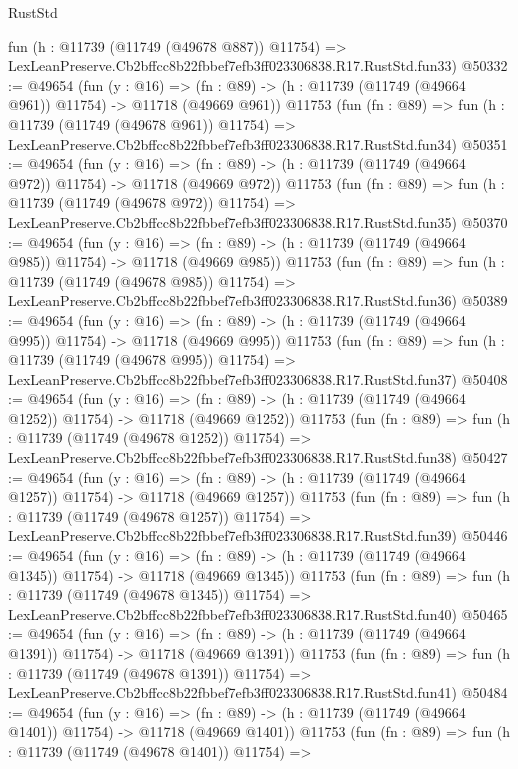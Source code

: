 \begin{lexlean}{RustStd}
\begin{coremodule}
    fun (h : @11739 (@11749 (@49678 @887)) @11754) =>
    LexLeanPreserve.Cb2bffcc8b22fbbef7efb3ff023306838.R17.RustStd.fun33)
@50332 := @49654
    (fun (y : @16) =>
    (fn : @89) -> (h : @11739 (@11749 (@49664 @961)) @11754) -> @11718 (@49669 @961))
    @11753
    (fun (fn : @89) =>
    fun (h : @11739 (@11749 (@49678 @961)) @11754) =>
    LexLeanPreserve.Cb2bffcc8b22fbbef7efb3ff023306838.R17.RustStd.fun34)
@50351 := @49654
    (fun (y : @16) =>
    (fn : @89) -> (h : @11739 (@11749 (@49664 @972)) @11754) -> @11718 (@49669 @972))
    @11753
    (fun (fn : @89) =>
    fun (h : @11739 (@11749 (@49678 @972)) @11754) =>
    LexLeanPreserve.Cb2bffcc8b22fbbef7efb3ff023306838.R17.RustStd.fun35)
@50370 := @49654
    (fun (y : @16) =>
    (fn : @89) -> (h : @11739 (@11749 (@49664 @985)) @11754) -> @11718 (@49669 @985))
    @11753
    (fun (fn : @89) =>
    fun (h : @11739 (@11749 (@49678 @985)) @11754) =>
    LexLeanPreserve.Cb2bffcc8b22fbbef7efb3ff023306838.R17.RustStd.fun36)
@50389 := @49654
    (fun (y : @16) =>
    (fn : @89) -> (h : @11739 (@11749 (@49664 @995)) @11754) -> @11718 (@49669 @995))
    @11753
    (fun (fn : @89) =>
    fun (h : @11739 (@11749 (@49678 @995)) @11754) =>
    LexLeanPreserve.Cb2bffcc8b22fbbef7efb3ff023306838.R17.RustStd.fun37)
@50408 := @49654
    (fun (y : @16) =>
    (fn : @89) -> (h : @11739 (@11749 (@49664 @1252)) @11754) -> @11718 (@49669 @1252))
    @11753
    (fun (fn : @89) =>
    fun (h : @11739 (@11749 (@49678 @1252)) @11754) =>
    LexLeanPreserve.Cb2bffcc8b22fbbef7efb3ff023306838.R17.RustStd.fun38)
@50427 := @49654
    (fun (y : @16) =>
    (fn : @89) -> (h : @11739 (@11749 (@49664 @1257)) @11754) -> @11718 (@49669 @1257))
    @11753
    (fun (fn : @89) =>
    fun (h : @11739 (@11749 (@49678 @1257)) @11754) =>
    LexLeanPreserve.Cb2bffcc8b22fbbef7efb3ff023306838.R17.RustStd.fun39)
@50446 := @49654
    (fun (y : @16) =>
    (fn : @89) -> (h : @11739 (@11749 (@49664 @1345)) @11754) -> @11718 (@49669 @1345))
    @11753
    (fun (fn : @89) =>
    fun (h : @11739 (@11749 (@49678 @1345)) @11754) =>
    LexLeanPreserve.Cb2bffcc8b22fbbef7efb3ff023306838.R17.RustStd.fun40)
@50465 := @49654
    (fun (y : @16) =>
    (fn : @89) -> (h : @11739 (@11749 (@49664 @1391)) @11754) -> @11718 (@49669 @1391))
    @11753
    (fun (fn : @89) =>
    fun (h : @11739 (@11749 (@49678 @1391)) @11754) =>
    LexLeanPreserve.Cb2bffcc8b22fbbef7efb3ff023306838.R17.RustStd.fun41)
@50484 := @49654
    (fun (y : @16) =>
    (fn : @89) -> (h : @11739 (@11749 (@49664 @1401)) @11754) -> @11718 (@49669 @1401))
    @11753
    (fun (fn : @89) =>
    fun (h : @11739 (@11749 (@49678 @1401)) @11754) =>

\end{coremodule}
\end{lexlean}
